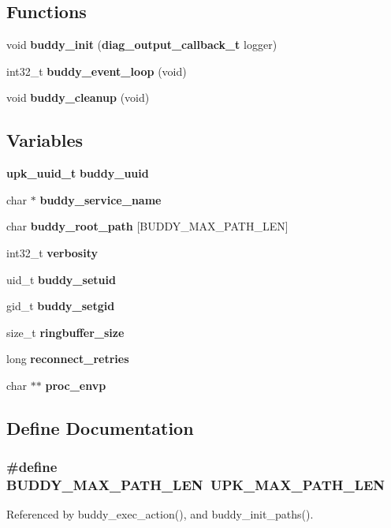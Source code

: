 \subsection*{Functions}
\begin{DoxyCompactItemize}
\item 
void {\bf buddy\_\-init} ({\bf diag\_\-output\_\-callback\_\-t} logger)
\item 
int32\_\-t {\bf buddy\_\-event\_\-loop} (void)
\item 
void {\bf buddy\_\-cleanup} (void)
\end{DoxyCompactItemize}
\subsection*{Variables}
\begin{DoxyCompactItemize}
\item 
{\bf upk\_\-uuid\_\-t} {\bf buddy\_\-uuid}
\item 
char $\ast$ {\bf buddy\_\-service\_\-name}
\item 
char {\bf buddy\_\-root\_\-path} [BUDDY\_\-MAX\_\-PATH\_\-LEN]
\item 
int32\_\-t {\bf verbosity}
\item 
uid\_\-t {\bf buddy\_\-setuid}
\item 
gid\_\-t {\bf buddy\_\-setgid}
\item 
size\_\-t {\bf ringbuffer\_\-size}
\item 
long {\bf reconnect\_\-retries}
\item 
char $\ast$$\ast$ {\bf proc\_\-envp}
\end{DoxyCompactItemize}


\subsection{Define Documentation}
\subsubsection[{BUDDY\_\-MAX\_\-PATH\_\-LEN}]{\setlength{\rightskip}{0pt plus 5cm}\#define BUDDY\_\-MAX\_\-PATH\_\-LEN~UPK\_\-MAX\_\-PATH\_\-LEN}\label{buddy_8h_a64b79a6c5e830efc3d0064b7d084988c}


Referenced by buddy\_\-exec\_\-action(), and buddy\_\-init\_\-paths().

